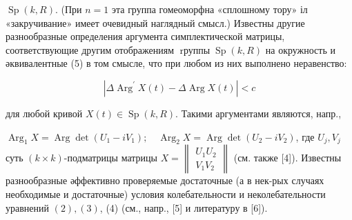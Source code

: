 \documentclass[10pt]{article}
\begin{document}
$\operatorname{Sp}(k, R)$. (При $n=1$ эта группа гомеоморфна «сплошному тору» іл «закручивание» имеет очевидный наглядный смысл.) Известны другие разнообразные определения аргумента симплектической матрицы, соответствующие другим отображениям $\operatorname{rруппы} \operatorname{Sp}(k, R)$ на окружность и әквивалентные (5) в том смысле, что при любом из них выполнено неравенство:



\[

\left|\Delta \operatorname{Arg}^{\prime} X(t)-\Delta \operatorname{Arg} X(t)\right|<c

\]



для любой кривой $X(t) \in \operatorname{Sp}(k, R)$. Такими аргументами являются, напр.,



$\operatorname{Arg}_{1} X=\operatorname{Arg} \operatorname{det}\left(U_{1}-i V_{1}\right) ; \quad \operatorname{Arg}_{2} X=\operatorname{Arg} \operatorname{det}\left(U_{2}-i V_{2}\right)$, где $U_{j}, V_{j}$ суть $(k \times k)$-подматрицы матрицы $X=\left\|\begin{array}{c}U_{1} U_{2} \\ V_{1} V_{2}\end{array}\right\|$ (см. также [4]). Известны разнообразные әффективно проверяемые достаточные (а в нек-рых случаях необходимые и достаточные) условия колебательности и неколебательности уравнений $(2),(3)$, (4) (см., напр., [5] и литературу в [6]).
\end{document}

